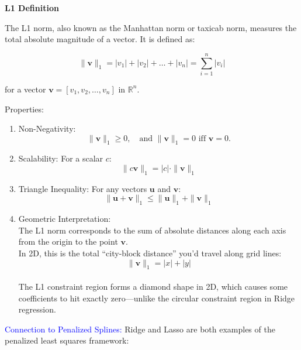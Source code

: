 \documentclass[
  letterpaper,
  DIV=11,
  numbers=noendperiod]{scrreprt}
\begin{document}
\begin{tcolorbox}[enhanced jigsaw, rightrule=.15mm, breakable, left=2mm, colframe=quarto-callout-tip-color-frame, opacityback=0, leftrule=.75mm, toprule=.15mm, colback=white, arc=.35mm, bottomrule=.15mm]

\textbf{L1 Definition}\vspace{2mm}

The L1 norm, also known as the Manhattan norm or taxicab norm, measures
the total absolute magnitude of a vector. It is defined as:

\[
\|\mathbf{v}\|_1 = |v_1| + |v_2| + \dots + |v_n| = \sum_{i=1}^n |v_i|
\]

for a vector \(\mathbf{v} = [v_1, v_2, \dots, v_n]\) in
\(\mathbb{R}^n\).

Properties:

\begin{enumerate}
\def\labelenumi{\arabic{enumi}.}
\item
  Non-Negativity:\\
  \[
  \|\mathbf{v}\|_1 \geq 0, \quad \text{and } \|\mathbf{v}\|_1 = 0 \text{ iff } \mathbf{v} = 0.
  \]
\item
  Scalability: For a scalar \(c\):\\
  \[
  \|c\mathbf{v}\|_1 = |c| \cdot \|\mathbf{v}\|_1
  \]
\item
  Triangle Inequality: For any vectors \(\mathbf{u}\) and
  \(\mathbf{v}\):\\
  \[
  \|\mathbf{u} + \mathbf{v}\|_1 \leq \|\mathbf{u}\|_1 + \|\mathbf{v}\|_1
  \]
\item
  Geometric Interpretation:\\
  The L1 norm corresponds to the sum of absolute distances along each
  axis from the origin to the point \(\mathbf{v}\).\\
  In 2D, this is the total ``city-block distance'' you'd travel along
  grid lines:\\
  \[
  \|\mathbf{v}\|_1 = |x| + |y|
  \]\\
  The L1 constraint region forms a diamond shape in 2D, which causes
  some coefficients to hit exactly zero---unlike the circular constraint
  region in Ridge regression.\\
\end{enumerate}

\end{tcolorbox}

\textcolor{blue}{Connection to Penalized Splines:} Ridge and Lasso are
both examples of the penalized least squares framework:
\end{document}
